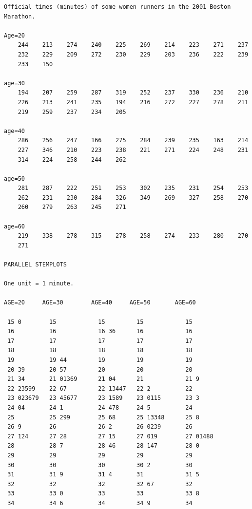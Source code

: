 \documentclass[
]{book}
\begin{document}
\begin{verbatim}
Official times (minutes) of some women runners in the 2001 Boston Marathon.

Age=20
    244    213    274    240    225    269    214    223    271    237
    232    229    209    272    230    229    203    236    222    239
    233    150

age=30
    194    207    259    287    319    252    237    330    236    210
    226    213    241    235    194    216    272    227    278    211
    219    259    237    234    205

age=40
    286    256    247    166    275    284    239    235    163    214
    227    346    210    223    238    221    271    224    248    231
    314    224    258    244    262

age=50
    281    287    222    251    253    302    235    231    254    253
    262    231    230    284    326    349    269    327    258    270
    260    279    263    245    271

age=60
    219    338    278    315    278    258    274    233    280    270
    271

PARALLEL STEMPLOTS

One unit = 1 minute.

AGE=20     AGE=30        AGE=40     AGE=50       AGE=60

 15 0        15            15         15            15
 16          16            16 36      16            16
 17          17            17         17            17
 18          18            18         18            18
 19          19 44         19         19            19
 20 39       20 57         20         20            20
 21 34       21 01369      21 04      21            21 9
 22 23599    22 67         22 13447   22 2          22 
 23 023679   23 45677      23 1589    23 0115       23 3
 24 04       24 1          24 478     24 5          24 
 25          25 299        25 68      25 13348      25 8
 26 9        26            26 2       26 0239       26 
 27 124      27 28         27 15      27 019        27 01488
 28          28 7          28 46      28 147        28 0
 29          29            29         29            29 
 30          30            30         30 2          30 
 31          31 9          31 4       31            31 5
 32          32            32         32 67         32 
 33          33 0          33         33            33 8
 34          34 6          34         34 9          34
\end{verbatim}
\end{document}
